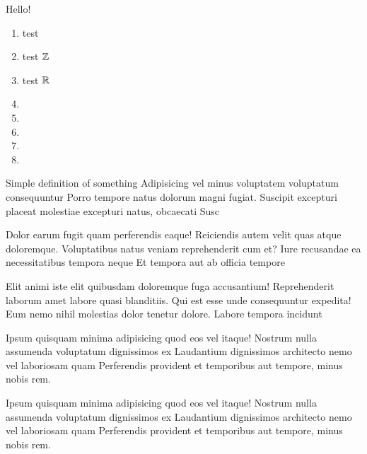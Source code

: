 \documentclass{article}
\begin{document}
    \maketitle[small]
    Hello!
    \begin{enumerate}[label=\listAlphP]
        \item test \nsN{}
        \item test \(\mathbb{Z}{}\)
        \item test \(\mathbb{R}{}\)
        \item {}
        \item {}  
        \item {}
        \item {}
        \item {}  
    \end{enumerate}
    \begin{definition}
        Simple definition of something Adipisicing vel minus voluptatem voluptatum consequuntur Porro tempore natus dolorum magni fugiat. Suscipit excepturi placeat molestiae excepturi natus, obcaecati Susc
    \end{definition}
    \begin{theorem}
        Dolor earum fugit quam perferendis eaque! Reiciendis autem velit quas atque doloremque. Voluptatibus natus veniam reprehenderit cum et? Iure recusandae ea necessitatibus tempora neque Et tempora aut ab officia tempore
    \end{theorem}
    \begin{lemma}
        Elit animi iste elit quibusdam doloremque fuga accusantium! Reprehenderit laborum amet labore quasi blanditiis. Qui est esse unde consequuntur expedita! Eum nemo nihil molestias dolor tenetur dolore. Labore tempora incidunt
    \end{lemma}
    \begin{corollary}
        Ipsum quisquam minima adipisicing quod eos vel itaque! Nostrum nulla assumenda voluptatum dignissimos ex Laudantium dignissimos architecto nemo vel laboriosam quam Perferendis provident et temporibus aut tempore, minus nobis rem.
    \end{corollary}
    \begin{proposition}
        Ipsum quisquam minima adipisicing quod eos vel itaque! Nostrum nulla assumenda voluptatum dignissimos ex Laudantium dignissimos architecto nemo vel laboriosam quam Perferendis provident et temporibus aut tempore, minus nobis rem.
    \end{proposition}
\end{document}
